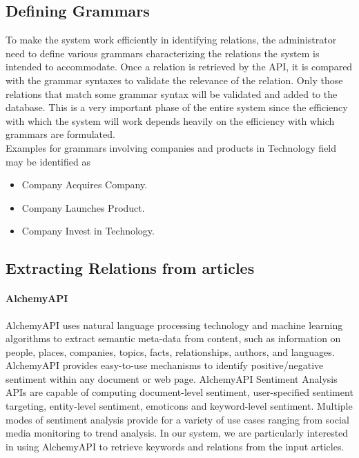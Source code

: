 \subsection{Defining Grammars}
\par To make the system work efficiently in identifying relations, the administrator need to define various grammars characterizing the relations the system is intended to accommodate. Once a relation is retrieved by the API, it is compared with the grammar syntaxes to validate the relevance of the relation. Only those relations that match some grammar syntax will be validated and added to the database. This is a very important phase of the entire system since the efficiency with which the system will work depends heavily on the efficiency with which grammars are formulated.
\\
Examples for grammars involving companies and products in Technology field may be identified as
\begin{itemize}
\item Company Acquires Company.
\item Company Launches Product.
\item Company Invest in Technology.
\end{itemize}

\subsection{Extracting Relations from articles}

\paragraph*{AlchemyAPI}
\hfill \break
AlchemyAPI uses natural language processing technology and machine learning 	algorithms to extract semantic meta-data from content, such as information on people, 	places, companies, topics, facts, relationships, authors, and languages. AlchemyAPI 	provides easy-to-use mechanisms to identify positive/negative sentiment within any 	document or web page. AlchemyAPI Sentiment Analysis APIs are capable of computing 	document-level sentiment, user-specified sentiment targeting, entity-level sentiment, 	emoticons and keyword-level sentiment. Multiple modes of sentiment analysis provide 	for a variety of use cases ranging from social media monitoring to trend analysis. In our system, we are particularly interested in using AlchemyAPI to retrieve keywords and relations from the input articles.

